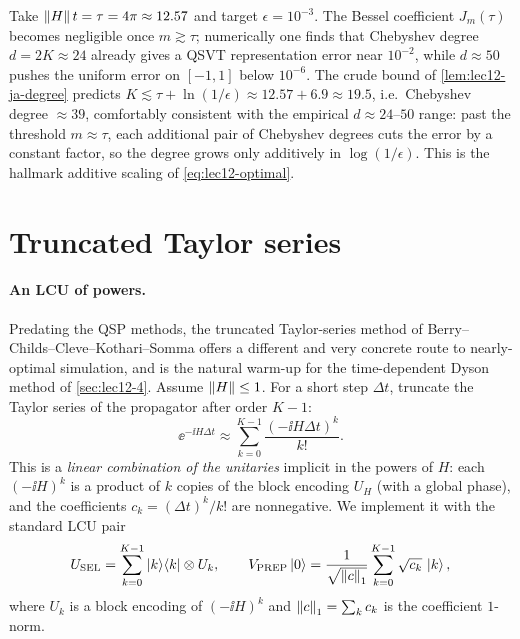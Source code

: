 \begin{example}[{Truncation degree for $\norm H t=4\pi$}]
\label{exa:lec12-degree}
Take $\left\lVert H \right\rVert t=\tau=4\pi\approx12.57$ and target $\epsilon=10^{-3}$. The Bessel
coefficient $J_m(\tau)$ becomes negligible once $m\gtrsim\tau$; numerically one finds that
Chebyshev degree $d=2K\approx24$ already gives a QSVT representation error near
$10^{-2}$, while $d\approx50$ pushes the uniform error on $[-1,1]$ below $10^{-6}$. The
crude bound of \cref{lem:lec12-ja-degree} predicts
$K\lesssim\tau+\ln(1/\epsilon)\approx12.57+6.9\approx19.5$, i.e.\ Chebyshev degree
$\approx39$, comfortably consistent with the empirical $d\approx24$--$50$ range: past the
threshold $m\approx\tau$, each additional pair of Chebyshev degrees cuts the error by a
constant factor, so the degree grows only additively in $\log(1/\epsilon)$. This is the
hallmark additive scaling of \eqref{eq:lec12-optimal}.
\end{example}

\section{Truncated Taylor series}
\label{sec:lec12-2}

\paragraph{An LCU of powers.}
Predating the QSP methods, the truncated Taylor-series method of Berry--Childs--Cleve--Kothari--Somma
offers a different and very concrete route to nearly-optimal simulation, and is the natural
warm-up for the time-dependent Dyson method of \cref{sec:lec12-4}. Assume $\left\lVert H \right\rVert\le1$.
For a short step $\Delta t$, truncate the Taylor series of the propagator after order
$K-1$:
\begin{equation}
  \ee^{-\ii H\Delta t}\approx\sum_{k=0}^{K-1}\frac{(-\ii H\Delta t)^k}{k!}.
  \label{eq:lec12-taylor}
\end{equation}
This is a \emph{linear combination of the unitaries} implicit in the powers of $H$: each
$(-\ii H)^k$ is a product of $k$ copies of the block encoding $U_H$ (with a global phase),
and the coefficients $c_k=(\Delta t)^k/k!$ are nonnegative. We implement it with the
standard LCU pair
\begin{equation}
  U_{\mathrm{SEL}}=\sum_{k=0}^{K-1}\ket{k}\!\bra{k}\otimes U_k,
  \qquad
  V_{\mathrm{PREP}}\ket{0}=\frac{1}{\sqrt{\left\lVert c \right\rVert_1}}\sum_{k=0}^{K-1}\sqrt{c_k}\,\ket{k},
  \label{eq:lec12-taylor-lcu}
\end{equation}
where $U_k$ is a block encoding of $(-\ii H)^k$ and $\left\lVert c \right\rVert_1=\sum_k c_k$ is the
coefficient $1$-norm.

